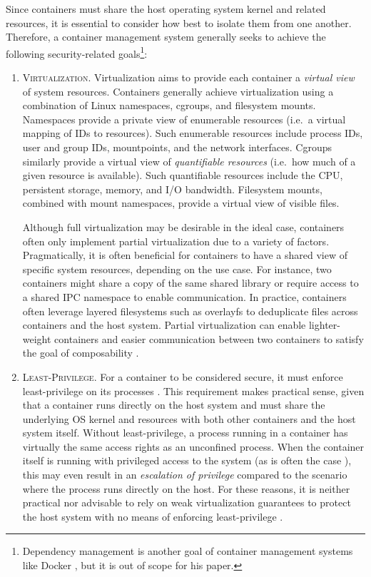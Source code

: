 Since containers must share the host operating system kernel and related resources, it is essential to consider how best to isolate them from one another. Therefore, a container management system generally seeks to achieve the following security-related goals\footnote{Dependency management is another goal of container management systems like Docker , but it is out of scope for his paper.}:
\begin{enumerate}[label=\bfseries CG\arabic*., ref=CG\arabic*, labelindent=1em]
  \item \textsc{Virtualization.}
    Virtualization aims to provide each container a \textit{virtual view} of system resources. Containers generally achieve virtualization using a combination of Linux namespaces, cgroups, and filesystem mounts. Namespaces provide a private view of enumerable resources (i.e.~a virtual mapping of IDs to resources). Such enumerable resources include process IDs, user and group IDs, mountpoints, and the network interfaces. Cgroups similarly provide a virtual view of \textit{quantifiable resources} (i.e.~how much of a given resource is available). Such quantifiable resources include the CPU, persistent storage, memory, and I/O bandwidth. Filesystem mounts, combined with mount namespaces, provide a virtual view of visible files.

    Although full virtualization may be desirable in the ideal case, containers often only implement partial virtualization \cite{sultan2019_container_security,xin2018_container_security} due to a variety of factors. Pragmatically, it is often beneficial for containers to have a shared view of specific system resources, depending on the use case. For instance, two containers might share a copy of the same shared library or require access to a shared IPC namespace to enable communication. In practice, containers often leverage layered filesystems such as overlayfs \cite{edge2010_overlayfs} to deduplicate files across containers and the host system. Partial virtualization can enable lighter-weight containers and easier communication between two containers to satisfy the goal of composability \cite{sultan2019_container_security}.

  \item \textsc{Least-Privilege.}
    For a container to be considered secure, it must enforce least-privilege on its processes \cite{sultan2019_container_security}. This requirement makes practical sense, given that a container runs directly on the host system and must share the underlying OS kernel and resources with both other containers and the host system itself. Without least-privilege, a process running in a container has virtually the same access rights as an unconfined process. When the container itself is running with privileged access to the system (as is often the case \cite{sultan2019_container_security,xin2018_container_security}), this may even result in an \textit{escalation of privilege} compared to the scenario where the process runs directly on the host. For these reasons, it is neither practical nor advisable to rely on weak virtualization guarantees to protect the host system with no means of enforcing least-privilege \cite{sultan2019_container_security}.


\end{enumerate}
